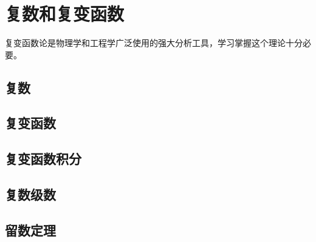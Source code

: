 


\chapter{复数和复变函数}
复变函数论是物理学和工程学广泛使用的强大分析工具，学习掌握这个理论十分必要。
\section{复数}

\section{复变函数}

\label{sec:complexfunctions}





\section{复变函数积分}



\section{复数级数}






\section{留数定理}

